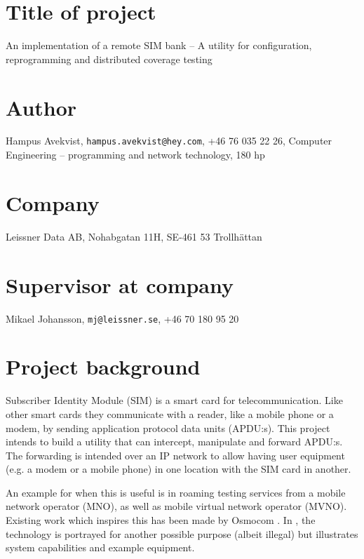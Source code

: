 \documentclass[12pt]{article}
\begin{document}
\thispagestyle{fancy}

\section*{Title of project}
An implementation of a remote SIM bank -- A utility for
configuration, reprogramming and distributed coverage testing

\section*{Author}
Hampus Avekvist,\newline
\verb|hampus.avekvist@hey.com|,\newline
+46 76 035 22 26,\newline
Computer Engineering -- programming and network technology, 180 hp

\section*{Company}
Leissner Data AB,\newline
Nohabgatan 11H, SE-461 53 Trollhättan

\section*{Supervisor at company}
Mikael Johansson,\newline
\verb|mj@leissner.se|,\newline
+46 70 180 95 20

\section*{Project background}

Subscriber Identity Module (SIM) is a smart card for telecommunication.
Like other smart cards they communicate with a reader, like a mobile
phone or a modem, by sending application protocol data units (APDU:s).
This project intends to build a utility that can intercept, manipulate
and forward APDU:s. The forwarding is intended over an IP network to
allow having user equipment (e.g. a modem or a mobile phone) in one
location with the SIM card in another.

An example for when this is useful is in roaming testing services
from a mobile network operator (MNO), as well as mobile virtual
network operator (MVNO). Existing work which inspires this has been
made by Osmocom \cite{osmocom-remsim}. In \cite{alghawi-simbox}, the technology
is portrayed for another possible purpose (albeit illegal) but
illustrates system capabilities and example equipment.
\end{document}
